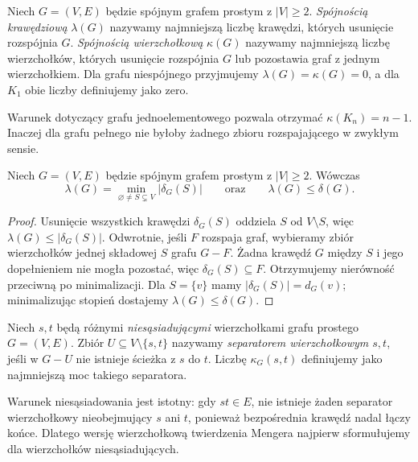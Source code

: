 \begin{definicja}
Niech $G=(V,E)$ będzie spójnym grafem prostym z $|V|\ge2$.
\emph{Spójnością krawędziową} $\lambda(G)$ nazywamy
najmniejszą liczbę krawędzi, których usunięcie rozspójnia $G$.
\emph{Spójnością wierzchołkową} $\kappa(G)$ nazywamy
najmniejszą liczbę wierzchołków, których usunięcie
rozspójnia $G$ lub pozostawia graf z jednym wierzchołkiem.
Dla grafu niespójnego przyjmujemy $\lambda(G)=\kappa(G)=0$,
a dla $K_1$ obie liczby definiujemy jako zero.
\end{definicja}

Warunek dotyczący grafu jednoelementowego pozwala
otrzymać $\kappa(K_n)=n-1$. Inaczej dla grafu pełnego
nie byłoby żadnego zbioru rozspajającego w zwykłym sensie.

\begin{stwierdzenie}
\label{prop:tg-lambda-cut}
Niech $G=(V,E)$ będzie spójnym grafem prostym z $|V|\ge2$.
Wówczas
\[
\lambda(G)=\min_{\varnothing\ne S\subsetneq V}|\delta_G(S)|
\qquad\text{oraz}\qquad \lambda(G)\le \delta(G).
\]
\end{stwierdzenie}

\begin{proof}
Usunięcie wszystkich krawędzi $\delta_G(S)$ oddziela
$S$ od $V\setminus S$, więc
$\lambda(G)\le|\delta_G(S)|$.
Odwrotnie, jeśli $F$ rozspaja graf, wybieramy zbiór
wierzchołków jednej składowej $S$ grafu $G-F$.
Żadna krawędź $G$ między $S$ i jego dopełnieniem
nie mogła pozostać, więc $\delta_G(S)\subseteq F$.
Otrzymujemy nierówność przeciwną po minimalizacji.
Dla $S=\{v\}$ mamy $|\delta_G(S)|=d_G(v)$;
minimalizując stopień dostajemy $\lambda(G)\le\delta(G)$.
\end{proof}

\begin{definicja}
Niech $s,t$ będą różnymi \emph{niesąsiadującymi} wierzchołkami
grafu prostego $G=(V,E)$. Zbiór $U\subseteq V\setminus\{s,t\}$
nazywamy \emph{separatorem wierzchołkowym $s,t$}, jeśli
w $G-U$ nie istnieje ścieżka z $s$ do $t$.
Liczbę $\kappa_G(s,t)$ definiujemy jako najmniejszą
moc takiego separatora.
\end{definicja}

Warunek niesąsiadowania jest istotny: gdy $st\in E$,
nie istnieje żaden separator wierzchołkowy nieobejmujący
$s$ ani $t$, ponieważ bezpośrednia krawędź nadal łączy końce.
Dlatego wersję wierzchołkową twierdzenia Mengera
najpierw sformułujemy dla wierzchołków niesąsiadujących.

